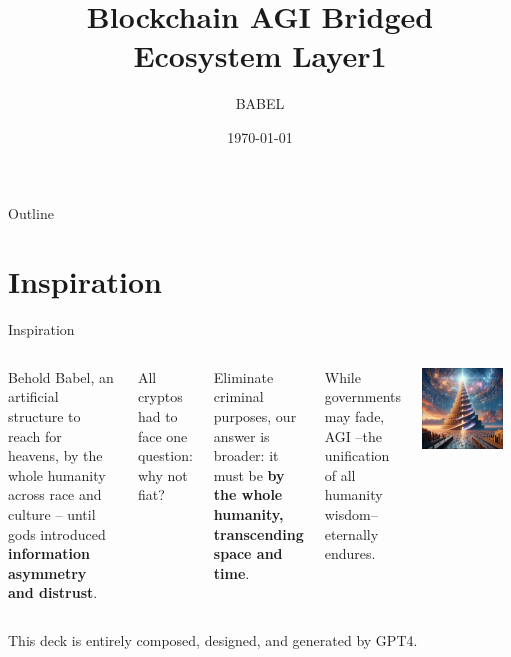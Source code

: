 \documentclass{beamer}
\title{B{\tiny lockchain} A{\tiny GI} B{\tiny ridged} E{\tiny cosystem} L{\tiny ayer1}}
\author{BABEL}
\institute{PIVOT DAO}
\date{\today}
\begin{document}
\begin{frame}
\titlepage
\end{frame}

\begin{frame}{Outline}
\tableofcontents
\end{frame}

\section{Inspiration}
\begin{frame}{Inspiration}

\begin{columns}
Behold Babel, an artificial structure to reach for heavens, by the whole humanity across race and culture -- until gods introduced \textbf{information asymmetry and distrust}. 

\vspace{9pt}
All cryptos had to face one question: why not fiat? 

\vspace{9pt}
Eliminate criminal purposes, our answer is broader: it must be \textbf{by the whole humanity, transcending space and time}. 

\vspace{9pt}
While governments may fade, AGI --the unification of all humanity wisdom-- eternally endures.
\begin{center}
\includegraphics[width=0.9\textwidth]{images/babel.png}
\end{center}
\end{columns}
\begin{center}
{\footnotesize This deck is entirely composed, designed, and generated by GPT4. }
\end{center}
\end{frame}
\end{document}
